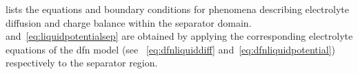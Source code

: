 

 lists  the equations and  boundary conditions
for  phenomena  describing  electrolyte  diffusion  and  charge  balance  within
the separator  domain.  and~\cref{eq:liquidpotentialsep}
are  obtained  by  applying  the  corresponding  electrolyte  equations  of  the
\gls{dfn} model  (see ~\cref{eq:dfnliquiddiff} and~\cref{eq:dfnliquidpotential})
respectively to the separator region.
